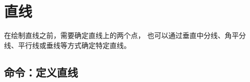 \documentclass[../main.tex]{subfiles}
\begin{document}
\section{直线}

在绘制直线之前，需要确定直线上的两个点，
也可以通过垂直中分线、角平分线、平行线或垂线等方式确定特定直线。

\subsection{命令：定义直线}
\end{document}
